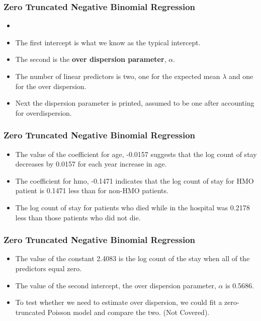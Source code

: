 \documentclass[MASTER.tex]{subfiles}
\begin{document}
\begin{frame}
	\frametitle{Zero Truncated Negative Binomial Regression}
	\large
	\begin{itemize}
		\item 

\item The first intercept is what we know as the typical intercept. 
\item The second is the \textbf{over dispersion parameter}, $\alpha$.
\item The number of linear predictors is two, one for the expected mean $\lambda$ and one for the over dispersion.
\item Next the dispersion parameter is printed, assumed to be one after accounting for overdispersion.
\end{itemize}

\end{frame}
\begin{frame}
	\frametitle{Zero Truncated Negative Binomial Regression}
\begin{itemize}
\item The value of the coefficient for age, -0.0157 suggests that the log count of stay decreases by 0.0157 for each year increase in age.
\item The coefficient for hmo, -0.1471 indicates that the log count of stay for HMO patient is 0.1471 less than for non-HMO patients.
\item The log count of stay for patients who died while in the hospital was 0.2178 less than those patients who did not die.
\end{itemize}

\end{frame}
\begin{frame}
		\frametitle{Zero Truncated Negative Binomial Regression}
		\large
\begin{itemize}
	\item		
The value of the constant 2.4083 is the log count of the stay when all of the predictors equal zero.
\item The value of the second intercept, the over dispersion parameter, $\alpha$ is 0.5686.
\item To test whether we need to estimate over dispersion, we could fit a zero-truncated Poisson model and compare the two. (Not Covered).
\end{itemize}
\end{frame}
\end{document}

